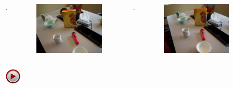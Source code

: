 \documentclass[]{beamer}
\newcommand{\video}[1]{
    \begin{center}
        \href{run:#1}{
            \includegraphics[width=1cm]{img/play.jpeg}
        }
    \end{center}
}
\begin{document}
\begin{frame}{}
\begin{columns}
        \begin{column}{0.5cm}
            \centering
            $\rightarrow$
        \end{column}

        \begin{column}{3cm}
            \begin{figure}[t]
                \centering
                \includegraphics[width=\textwidth]{img/rafaga/5.png}
            \end{figure}
        \end{column}

        \begin{column}{0.5cm}
            \centering
            $\rightarrow$
        \end{column}

        \begin{column}{3cm}
            \begin{figure}[t]
                \centering
                \includegraphics[width=\textwidth]{img/rafaga/6.png}
            \end{figure}
        \end{column}

    \end{columns}
    \video{videos/meeting_small.avi}
\end{frame}
\end{document}
